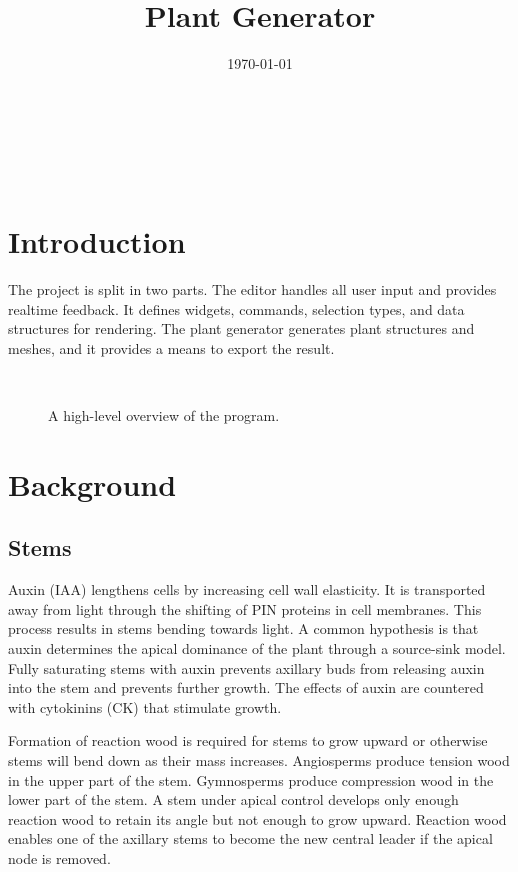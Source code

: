 \documentclass[10pt]{article}
\title{Plant Generator}
\date{\today}
\begin{document}
\begin{center}
  \\
 \vspace{1em}
 \begin{huge} \@title \end{huge} \\
 \vspace{1em}
 \@date
\end{center}
\tableofcontents
\pagebreak

\section{Introduction}

The project is split in two parts. The editor handles all user input and provides realtime feedback. It defines widgets, commands, selection types, and data structures for rendering. The plant generator generates plant structures and meshes, and it provides a means to export the result.

\begin{figure}[H]
\centering
 \\
\caption{A high-level overview of the program.}
\end{figure}

\section{Background}

\subsection{Stems}

Auxin (IAA) lengthens cells by increasing cell wall elasticity. It is transported away from light through the shifting of PIN proteins in cell membranes. This process results in stems bending towards light. A common hypothesis is that auxin determines the apical dominance of the plant through a source-sink model. Fully saturating stems with auxin prevents axillary buds from releasing auxin into the stem and prevents further growth. The effects of auxin are countered with cytokinins (CK) that stimulate growth.

Formation of reaction wood is required for stems to grow upward or otherwise stems will bend down as their mass increases. Angiosperms produce tension wood in the upper part of the stem. Gymnosperms produce compression wood in the lower part of the stem. A stem under apical control develops only enough reaction wood to retain its angle but not enough to grow upward. Reaction wood enables one of the axillary stems to become the new central leader if the apical node is removed.
\end{document}
